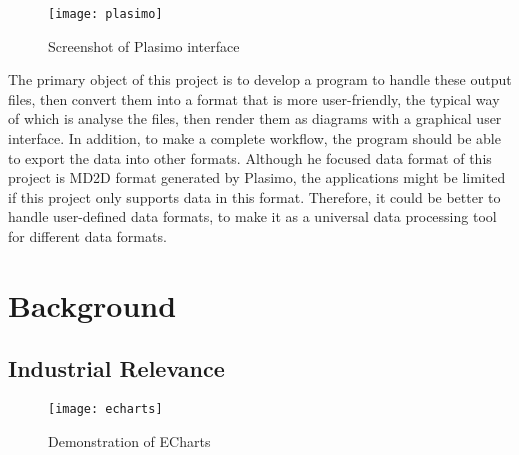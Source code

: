 \begin{figure}[!htb]
	\centering
	\texttt{[image: plasimo]}
	\caption{Screenshot of Plasimo interface\cite{ref:plasimo}}
	\label{fig:plasimo}
\end{figure}

The primary object of this project is to develop a program to handle these output files, then convert them into a format that is more user-friendly, the typical way of which is analyse the files, then render them as diagrams with a graphical user interface. In addition, to make a complete workflow, the program should be able to export the data into other formats. Although he focused data format of this project is MD2D format generated by Plasimo, the applications might be limited if this project only supports data in this format. Therefore, it could be better to handle user-defined data formats, to make it as a universal data processing tool for different data formats.

\section{Background}

\subsection{Industrial Relevance}

\begin{figure}[!tb]
	\centering
	\texttt{[image: echarts]}
	\caption{Demonstration of ECharts}
	\label{fig:echarts}
\end{figure}


